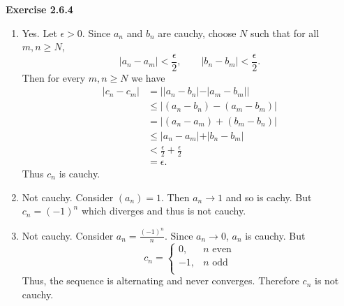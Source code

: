 \documentclass[12pt]{article}
\begin{document}
\textbf{Exercise 2.6.4}
\begin{enumerate}[label=(\alph*)]
    \item Yes. Let \( \epsilon > 0 \).
          Since \( a_n \) and \( b_n \) are cauchy, choose \( N \) such that for all \( m,n \geq N \),
          \[
              \vert a_n - a_m \vert < \frac{\epsilon}{2}, \qquad \vert b_n - b_m \vert < \frac{\epsilon}{2}.
          \]
          Then for every \( m,n \geq N \) we have
          \[
              \begin{split}
                  \vert c_n - c_m \vert & = \vert \vert a_n - b_n \vert - \vert a_m - b_m \vert  \vert \\
                                        & \leq \vert (a_n - b_n) - (a_m - b_m) \vert                   \\
                                        & = \vert (a_n - a_m) + (b_m - b_n) \vert                      \\
                                        & \leq \vert a_n - a_m \vert + \vert b_n - b_m \vert           \\
                                        & < \frac{\epsilon}{2} + \frac{\epsilon}{2}                    \\
                                        & = \epsilon.
              \end{split}
          \]
          Thus \( c_n \) is cauchy.
    \item Not cauchy. Consider \( (a_n) = 1 \).
          Then \( a_n \to 1 \) and so is cachy.
          But \( c_n = (-1)^n \) which diverges and thus is not cauchy.

    \item Not cauchy. Consider \( a_n = \frac{(-1)^n}{n} \).
          Since \( a_n \to 0 \), \( a_n \) is cauchy. But
          \[
              c_n = \begin{cases}
                  0,  & n \text{ even} \\
                  -1, & n \text{ odd}  \\
              \end{cases}
          \]
          Thus, the sequence is alternating and never converges. Therefore \( c_n \) is not cauchy.


\end{enumerate}
\end{document}
